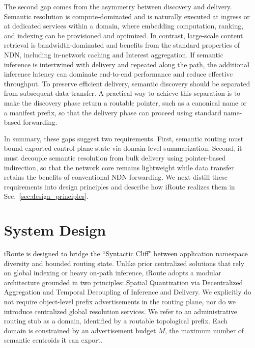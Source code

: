 \documentclass[conference]{IEEEtran}
\newcommand{\sysname}{iRoute}
\begin{document}
The second gap comes from the asymmetry between discovery and delivery. Semantic resolution is compute-dominated and is naturally executed at ingress or at dedicated services within a domain, where embedding computation, ranking, and indexing can be provisioned and optimized. In contrast, large-scale content retrieval is bandwidth-dominated and benefits from the standard properties of NDN, including in-network caching and Interest aggregation. If semantic inference is intertwined with delivery and repeated along the path, the additional inference latency can dominate end-to-end performance and reduce effective throughput. To preserve efficient delivery, semantic discovery should be separated from subsequent data transfer. A practical way to achieve this separation is to make the discovery phase return a routable pointer, such as a canonical name or a manifest prefix, so that the delivery phase can proceed using standard name-based forwarding.

In summary, these gaps suggest two requirements. First, semantic routing must bound exported control-plane state via domain-level summarization. Second, it must decouple semantic resolution from bulk delivery using pointer-based indirection, so that the network core remains lightweight while data transfer retains the benefits of conventional NDN forwarding. We next distill these requirements into design principles and describe how \sysname{} realizes them in Sec.~\ref{sec:design_principles}.

\section{System Design}
\label{sec:design}

\sysname{} is designed to bridge the ``Syntactic Cliff" between application namespace diversity and bounded routing state. Unlike prior centralized solutions that rely on global indexing or heavy on-path inference, \sysname{} adopts a modular architecture grounded in two principles: Spatial Quantization via Decentralized Aggregation and Temporal Decoupling of Inference and Delivery. We explicitly do not require object-level prefix advertisements in the routing plane, nor do we introduce centralized global resolution services. We refer to an administrative routing stub as a domain, identified by a routable topological prefix. Each domain is constrained by an advertisement budget $M$, the maximum number of semantic centroids it can export.
\end{document}
